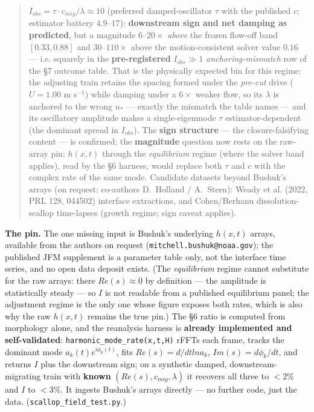 \documentclass[tc, manuscript]{copernicus}
\begin{document}
\begin{quote}
$I_{obs} = \tau \cdot c_{mig}/\lambda \approx 10$ (preferred damped-oscillator $\tau $ with the published $c$; estimator battery $4.9\mbox{--}17$): \textbf{downstream sign and net damping as predicted}, but a magnitude $6\mbox{--}20\times $ \emph{above} the frozen flow-off band $[0.33,0.88]$ and $30$--$110\times $ above the motion-consistent solver value $0.16$ — i.e. squarely in the \textbf{pre-registered} $I_{obs}\gg 1$ \emph{anchoring-mismatch} row of the §7 outcome table. That is the physically expected bin for this regime: the adjusting train retains the spacing formed under the \emph{pre-cut} drive ($U=1.00$ m s$^{-1}$) while damping under a $6\times $ weaker flow, so its $\lambda $ is anchored to the wrong $u_{*}$ — exactly the mismatch the table names — and its oscillatory amplitude makes a single-eigenmode $\tau $ estimator-dependent (the dominant spread in $I_{obs}$). The \textbf{sign structure} — the closure-falsifying content — is confirmed; the \textbf{magnitude} question now rests on the raw-array pin: $h(x,t)$ through the \emph{equilibrium} regime (where the solver band applies), read by the §6 harness, would replace both $\tau $ and $c$ with the complex rate of the same mode. Candidate datasets beyond Bushuk's arrays (on request; co-authors D.~Holland / A.~Stern): Weady et al. (2022, PRL 128, 044502) interface extractions, and Cohen/Berhanu dissolution-scallop time-lapses (growth regime; sign caveat applies).
\end{quote}

\textbf{The pin.} The one missing input is Bushuk's underlying $h(x,t)$ arrays, available from the authors on request (\texttt{mitchell.\allowbreak{}bushuk@noaa.\allowbreak{}gov}); the published JFM supplement is a parameter table only, not the interface time series, and no open data deposit exists. (The \emph{equilibrium} regime cannot substitute for the raw arrays: there $Re(s)\approx 0$ by definition — the amplitude is statistically steady — so $I$ is not readable from a published equilibrium panel; the adjustment regime is the only one whose figure exposes both rates, which is also why the raw $h(x,t)$ remains the true pin.) The §6 ratio is computed from morphology alone, and the reanalysis harness is \textbf{already implemented and self-validated}: \texttt{harmonic\_\allowbreak{}mode\_\allowbreak{}rate(x,t,H)} rFFTs each frame, tracks the dominant mode $a_{k}(t)e^{i\phi _{k}(t)}$, fits $Re(s)=d/dt ln a_{k}$, $Im(s)=d\phi _{k}/dt$, and returns $I$ plus the downstream sign; on a synthetic damped, downstream-migrating train with \textbf{known} $(Re(s), c_{mig}, \lambda )$ it recovers all three to $<2\%$ and $I$ to $<3\%$. It ingests Bushuk's arrays directly — no further code, just the data. (\texttt{scallop\_\allowbreak{}field\_\allowbreak{}test.\allowbreak{}py}.)
\end{document}
